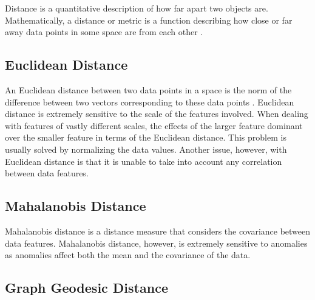 Distance is a quantitative description of how far apart two objects are.
Mathematically, a distance or metric is a function describing how close or far
away data points in some space are from each other \cite{Khoa:2012}.

\subsection{Euclidean Distance}
\label{euclidianDistance}
An Euclidean distance between two data points in a space is the norm of the
difference between two vectors corresponding to these data points
\cite{Khoa:2012}. Euclidean distance is extremely sensitive to the scale of the
features involved. When dealing with features of vastly different scales, the
effects of the larger feature dominant over the smaller feature in terms of the
Euclidean distance. This problem is usually solved by normalizing the data
values. Another issue, however, with Euclidean distance is that it is unable to
take into account any correlation between data features.

\subsection{Mahalanobis Distance}
\label{mahalanobisDistance}
Mahalanobis distance is a distance measure that considers the covariance between
data features. Mahalanobis distance, however, is extremely sensitive to
anomalies as anomalies affect both the mean and the covariance of the data.

\subsection{Graph Geodesic Distance}
\label{graphGeodesicDistance}
